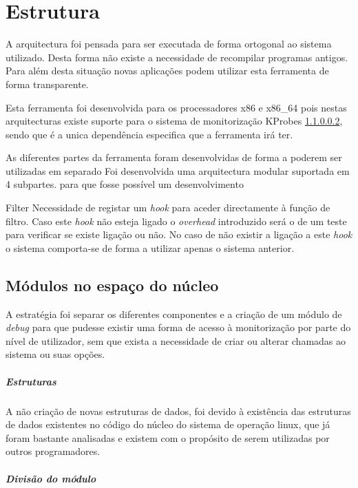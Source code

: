 \chapter{Estrutura}
\label{cap:Estrutura}


A arquitectura foi pensada para ser executada de forma ortogonal ao sistema
utilizado. Desta forma não existe a necessidade de recompilar programas
antigos. Para além desta situação novas aplicações podem utilizar esta
ferramenta de forma transparente.

Esta ferramenta foi desenvolvida para os processadores x86 e x86\_64 pois nestas
arquitecturas existe suporte para o sistema de monitorização KProbes \ref{},
sendo que é a unica dependência especifica que a ferramenta irá ter.

As diferentes partes da ferramenta foram desenvolvidas de forma a poderem ser
utilizadas em separado  
Foi desenvolvida uma arquitectura modular suportada em 4 subpartes.  para
que fosse possível um desenvolvimento 

Filter 
Necessidade de registar um \textit{hook} para aceder directamente à função de
filtro. Caso este \textit{hook} não esteja ligado o \textit{overhead}
introduzido será o de um teste para verificar se existe ligação ou não.
No caso de não existir a ligação a este \textit{hook} o sistema comporta-se de
forma a utilizar apenas o sistema anterior.

\section{Módulos no espaço do núcleo}

A estratégia foi separar os diferentes componentes e a criação de um módulo de
\textit{debug} para que pudesse existir uma forma de acesso à monitorização por
parte do nível de utilizador, sem que exista a necessidade de criar ou alterar
chamadas ao sistema ou suas opções.

\paragraph{Estruturas}

A não criação de novas estruturas de dados, foi devido à existência das
estruturas de dados existentes no código do núcleo do sistema de operação
linux, que já foram bastante analisadas e existem com o propósito de serem
utilizadas por outros programadores.

\paragraph{Divisão do módulo} 

